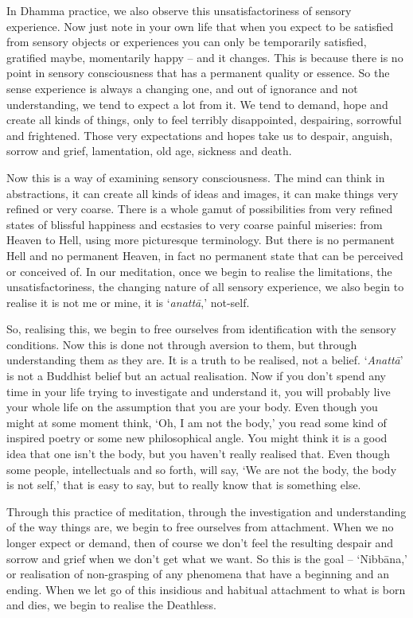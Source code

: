 In Dhamma practice, we also observe this unsatisfactoriness of sensory experience. Now just note in your own life that when you expect to be satisfied from sensory objects or experiences you can only be temporarily satisfied, gratified maybe, momentarily happy -- and it changes. This is because there is no point in sensory consciousness that has a permanent quality or essence. So the sense experience is always a changing one, and out of ignorance and not understanding, we tend to expect a lot from it. We tend to demand, hope and create all kinds of things, only to feel terribly disappointed, despairing, sorrowful and frightened. Those very expectations and hopes take us to despair, anguish, sorrow and grief, lamentation, old age, sickness and death.

Now this is a way of examining sensory consciousness. The mind can think in abstractions, it can create all kinds of ideas and images, it can make things very refined or very coarse. There is a whole gamut of possibilities from very refined states of blissful happiness and ecstasies to very coarse painful miseries: from Heaven to Hell, using more picturesque terminology. But there is no permanent Hell and no permanent Heaven, in fact no permanent state that can be perceived or conceived of. In our meditation, once we begin to realise the limitations, the unsatisfactoriness, the changing nature of all sensory experience, we also begin to realise it is not me or mine, it is `\textit{anattā},' not-self.

So, realising this, we begin to free ourselves from identification with the sensory conditions. Now this is done not through aversion to them, but through understanding them as they are. It is a truth to be realised, not a belief. `\textit{Anattā}' is not a Buddhist belief but an actual realisation. Now if you don't spend any time in your life trying to investigate and understand it, you will probably live your whole life on the assumption that you are your body. Even though you might at some moment think, `Oh, I am not the body,' you read some kind of inspired poetry or some new philosophical angle. You might think it is a good idea that one isn't the body, but you haven't really realised that. Even though some people, intellectuals and so forth, will say, `We are not the body, the body is not self,' that is easy to say, but to really know that is something else.

Through this practice of meditation, through the investigation and understanding of the way things are, we begin to free ourselves from attachment. When we no longer expect or demand, then of course we don't feel the resulting despair and sorrow and grief when we don't get what we want. So this is the goal -- `Nibbāna,' or realisation of non-grasping of any phenomena that have a beginning and an ending. When we let go of this insidious and habitual attachment to what is born and dies, we begin to realise the Deathless.

